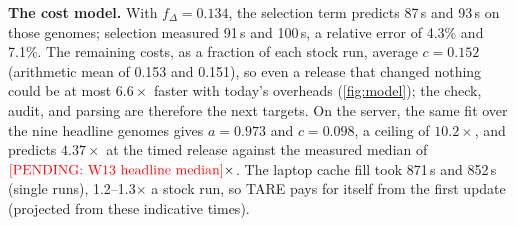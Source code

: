 \documentclass[letterpaper,twocolumn,10pt]{article}
\theoremstyle{definition}
\newcommand{\sys}{TARE\xspace}
\newcommand{\sys}{PARE\xspace}
\begin{document}
\textbf{The cost model.} With $f_\Delta = 0.134$, the selection term predicts 87\,s and 93\,s on those genomes; selection measured 91\,s and 100\,s, a
relative error of 4.3\% and 7.1\%. The remaining costs, as a fraction of each stock run, average $c = 0.152$ (arithmetic mean of 0.153 and 0.151), so even a release that changed
nothing could be at most $6.6\times$ faster with today's overheads (\cref{fig:model}); the check, audit, and parsing are
therefore the next targets. On the server, the same fit over the nine headline genomes gives $a = 0.973$ and
$c = 0.098$, a ceiling of $10.2\times$, and predicts $4.37\times$ at the timed release against the measured median of
$\textcolor{red}{\mbox{[PENDING: W13 headline median]}}\times$.
The laptop cache fill took 871\,s and 852\,s (single runs),
1.2--1.3$\times$ a stock run, so \sys pays for itself from the first update (projected from these indicative times).
\end{document}
